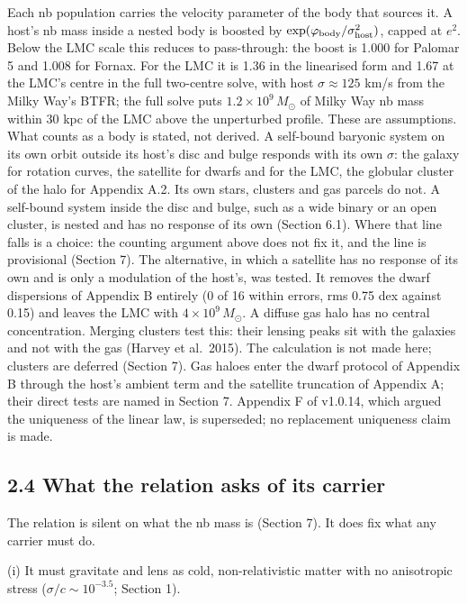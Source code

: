\documentclass[
  10pt,
]{article}
\begin{document}
Each nb population carries the velocity parameter of the body that sources it. A host's nb mass inside a nested body is boosted by $\exp(\varphi_{\rm body}/\sigma_{\rm host}^2)$, capped at $e^2$. Below the LMC scale this reduces to pass-through: the boost is 1.000 for Palomar 5 and 1.008 for Fornax. For the LMC it is 1.36 in the linearised form and 1.67 at the LMC's centre in the full two-centre solve, with host $\sigma\approx125$ km/s from the Milky Way's BTFR; the full solve puts $1.2\times10^9\,M_\odot$ of Milky Way nb mass within 30 kpc of the LMC above the unperturbed profile. These are assumptions. What counts as a body is stated, not derived. A self-bound baryonic system on its own orbit outside its host's disc and bulge responds with its own $\sigma$: the galaxy for rotation curves, the satellite for dwarfs and for the LMC, the globular cluster of the halo for Appendix A.2. Its own stars, clusters and gas parcels do not. A self-bound system inside the disc and bulge, such as a wide binary or an open cluster, is nested and has no response of its own (Section 6.1). Where that line falls is a choice: the counting argument above does not fix it, and the line is provisional (Section 7). The alternative, in which a satellite has no response of its own and is only a modulation of the host's, was tested. It removes the dwarf dispersions of Appendix B entirely (0 of 16 within errors, rms 0.75 dex against 0.15) and leaves the LMC with $4\times10^9\,M_\odot$. A diffuse gas halo has no central concentration. Merging clusters test this: their lensing peaks sit with the galaxies and not with the gas (Harvey et al.~2015). The calculation is not made here; clusters are deferred (Section 7). Gas haloes enter the dwarf protocol of Appendix B through the host's ambient term and the satellite truncation of Appendix A; their direct tests are named in Section 7. Appendix F of v1.0.14, which argued the uniqueness of the linear law, is superseded; no replacement uniqueness claim is made.

\subsection{2.4 What the relation asks of its carrier}\label{carrier}

The relation is silent on what the nb mass is (Section 7). It does fix what any carrier must do.

(i) It must gravitate and lens as cold, non-relativistic matter with no anisotropic stress ($\sigma/c\sim10^{-3.5}$; Section 1).
\end{document}

